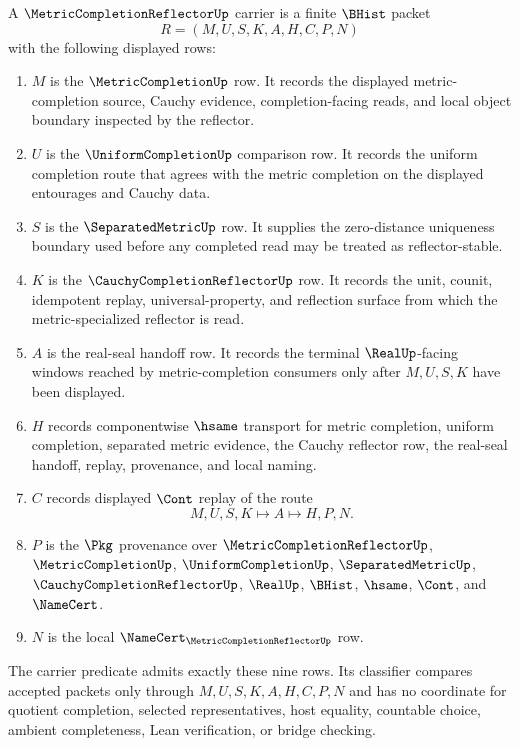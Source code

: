\begin{definition}
\label{def:metric-completion-reflector-carrier}
A $\MetricCompletionReflectorUp$ carrier is a finite $\BHist$ packet
$$
R=(M,U,S,K,A,H,C,P,N)
$$
with the following displayed rows:
\begin{enumerate}
\item $M$ is the $\MetricCompletionUp$ row. It records the displayed metric-completion source, Cauchy evidence, completion-facing reads, and local object boundary inspected by the reflector.
\item $U$ is the $\UniformCompletionUp$ comparison row. It records the uniform completion route that agrees with the metric completion on the displayed entourages and Cauchy data.
\item $S$ is the $\SeparatedMetricUp$ row. It supplies the zero-distance uniqueness boundary used before any completed read may be treated as reflector-stable.
\item $K$ is the $\CauchyCompletionReflectorUp$ row. It records the unit, counit, idempotent replay, universal-property, and reflection surface from which the metric-specialized reflector is read.
\item $A$ is the real-seal handoff row. It records the terminal $\RealUp$-facing windows reached by metric-completion consumers only after $M,U,S,K$ have been displayed.
\item $H$ records componentwise $\hsame$ transport for metric completion, uniform completion, separated metric evidence, the Cauchy reflector row, the real-seal handoff, replay, provenance, and local naming.
\item $C$ records displayed $\Cont$ replay of the route
$$
M,U,S,K \longmapsto A \longmapsto H,P,N .
$$
\item $P$ is the $\Pkg$ provenance over $\MetricCompletionReflectorUp$, $\MetricCompletionUp$, $\UniformCompletionUp$, $\SeparatedMetricUp$, $\CauchyCompletionReflectorUp$, $\RealUp$, $\BHist$, $\hsame$, $\Cont$, and $\NameCert$.
\item $N$ is the local $\NameCert_{\MetricCompletionReflectorUp}$ row.
\end{enumerate}
The carrier predicate admits exactly these nine rows. Its classifier compares accepted packets only through $M,U,S,K,A,H,C,P,N$ and has no coordinate for quotient completion, selected representatives, host equality, countable choice, ambient completeness, Lean verification, or bridge checking.
\end{definition}

